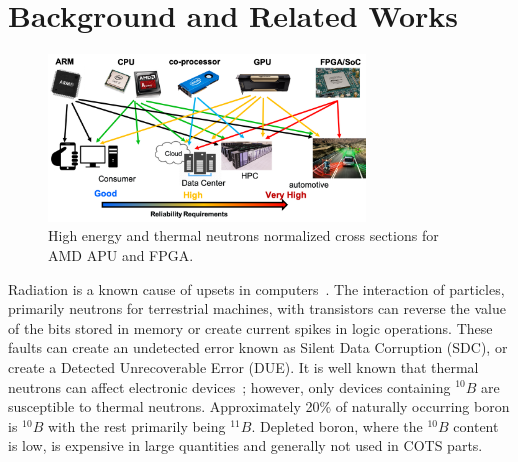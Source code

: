 \section{Background and Related Works}
\label{sec_background}

\begin{figure}[th]
	\centering
	\includegraphics[width=0.75\textwidth]{./figs/motivation.png}
	\caption{High energy and thermal neutrons normalized cross sections for AMD APU and FPGA.}
	\label{motivation}
\end{figure}

%

Radiation is a known cause of upsets in computers~\cite{Jedec2006}. The interaction of particles, primarily neutrons for terrestrial machines, with transistors can reverse the value of the bits stored in memory or create current spikes in logic operations. These faults can create an undetected error known as Silent Data Corruption (SDC), or create a Detected Unrecoverable Error (DUE). It is well known that thermal neutrons can affect electronic devices~\cite{Baumann2005, ziegler2003}; however, only devices containing $^{10}B$ are susceptible to thermal neutrons. 
Approximately 20\% of naturally occurring boron is $^{10}B$ with the rest primarily being $^{11}B$. Depleted boron, where the $^{10}B$ content is low, is expensive in large quantities and generally not used in COTS parts. %

